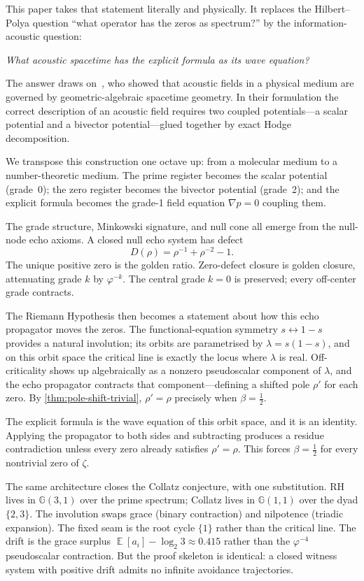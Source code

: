 \documentclass[11pt,a4paper]{article}
\theoremstyle{plain}
\theoremstyle{definition}
\theoremstyle{remark}
\numberwithin{equation}{section}
\newcommand{\Cl}{\mathbb{G}}
\newcommand{\vp}{\varphi}
\DeclareMathOperator{\E}{\mathbb{E}}
\begin{document}
This paper takes that statement literally and physically.  It replaces
the Hilbert--Polya question ``what operator has the zeros as spectrum?''
by the information-acoustic question:

\begin{center}
\emph{What acoustic spacetime has the explicit formula as its wave equation?}
\end{center}

The answer draws on~\cite{burns2024}, who showed that acoustic
fields in a physical medium are governed by geometric-algebraic
spacetime geometry.  In their formulation the correct description
of an acoustic field requires two coupled potentials---a scalar
potential and a bivector potential---glued together by exact Hodge
decomposition.

We transpose this construction one octave up: from a molecular
medium to a number-theoretic medium.  The prime register becomes
the scalar potential (grade~0); the zero register becomes the
bivector potential (grade~2); and the explicit formula becomes the
grade-1 field equation \(\nabla p=0\) coupling them.

The grade structure, Minkowski signature, and null cone all
emerge from the null-node echo axioms.  A closed null echo system
has defect
\[
  D(\rho)=\rho^{-1}+\rho^{-2}-1.
\]
The unique positive zero is the golden ratio.  Zero-defect closure is
golden closure, attenuating grade \(k\) by \(\vp^{-k}\).  The central
grade \(k=0\) is preserved; every off-center grade contracts.

The Riemann Hypothesis then becomes a statement about how this echo
propagator moves the zeros.  The functional-equation symmetry
\(s\leftrightarrow1-s\) provides a natural involution; its orbits
are parametrised by \(\lambda=s(1-s)\), and on this orbit space the
critical line is exactly the locus where \(\lambda\) is real.
Off-criticality shows up algebraically as a nonzero pseudoscalar
component of \(\lambda\), and the echo propagator contracts that
component---defining a shifted pole \(\rho'\) for each zero.  By
\cref{thm:pole-shift-trivial}, \(\rho'=\rho\) precisely when
\(\beta=\tfrac12\).

The explicit formula is the wave equation of this orbit space, and
it is an identity.  Applying the propagator to both sides and
subtracting produces a residue contradiction unless every zero
already satisfies \(\rho'=\rho\).  This forces \(\beta=\tfrac12\)
for every nontrivial zero of \(\zeta\).

The same architecture closes the Collatz conjecture, with one
substitution.  RH lives in \(\Cl(3,1)\) over the prime spectrum;
Collatz lives in \(\Cl(1,1)\) over the dyad \(\{2,3\}\).  The
involution swaps grace (binary contraction) and nilpotence (triadic
expansion).  The fixed seam is the root cycle \(\{1\}\) rather than
the critical line.  The drift is the grace surplus
\(\E[a_i]-\log_2 3\approx0.415\) rather than the
\(\vp^{-4}\) pseudoscalar contraction.  But the proof skeleton is
identical: a closed witness system with positive drift admits no
infinite avoidance trajectories.
\end{document}

